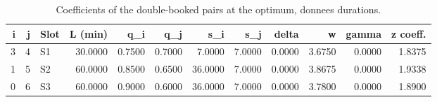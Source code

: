 \begin{table}[htbp]
\caption{Coefficients of the double-booked pairs at the optimum, donnees durations.}
\label{tab:pairs-donnees}
\begin{tabular}{rrlrrrrrrrrr}
\toprule
i & j & Slot & L (min) & q\_i & q\_j & s\_i & s\_j & delta & w & gamma & z coeff. \\
\midrule
3 & 4 & S1 & 30.0000 & 0.7500 & 0.7000 & 7.0000 & 7.0000 & 0.0000 & 3.6750 & 0.0000 & 1.8375 \\
1 & 5 & S2 & 60.0000 & 0.8500 & 0.6500 & 36.0000 & 7.0000 & 0.0000 & 3.8675 & 0.0000 & 1.9338 \\
0 & 6 & S3 & 60.0000 & 0.9000 & 0.6000 & 36.0000 & 7.0000 & 0.0000 & 3.7800 & 0.0000 & 1.8900 \\
\bottomrule
\end{tabular}
\end{table}
